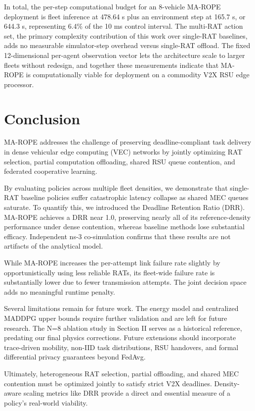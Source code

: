 \documentclass[journal,10pt,twocolumn]{IEEEtran}
\begin{document}
In total, the per-step computational budget for an 8-vehicle MA-ROPE deployment is fleet inference at 478.64 \textmu s plus an environment step at 165.7 \textmu s, or 644.3 \textmu s, representing 6.4\% of the 10 ms control interval. The multi-RAT action set, the primary complexity contribution of this work over single-RAT baselines, adds no measurable simulator-step overhead versus single-RAT offload. The fixed 12-dimensional per-agent observation vector lets the architecture scale to larger fleets without redesign, and together these measurements indicate that MA-ROPE is computationally viable for deployment on a commodity V2X RSU edge processor.



\section{Conclusion}

MA-ROPE addresses the challenge of preserving deadline-compliant task delivery in dense vehicular edge computing (VEC) networks by jointly optimizing RAT selection, partial computation offloading, shared RSU queue contention, and federated cooperative learning. 

By evaluating policies across multiple fleet densities, we demonstrate that single-RAT baseline policies suffer catastrophic latency collapse as shared MEC queues saturate. To quantify this, we introduced the Deadline Retention Ratio (DRR). MA-ROPE achieves a DRR near 1.0, preserving nearly all of its reference-density performance under dense contention, whereas baseline methods lose substantial efficacy. Independent ns-3 co-simulation confirms that these results are not artifacts of the analytical model.

While MA-ROPE increases the per-attempt link failure rate slightly by opportunistically using less reliable RATs, its fleet-wide failure rate is substantially lower due to fewer transmission attempts. The joint decision space adds no meaningful runtime penalty.

Several limitations remain for future work. The energy model and centralized MADDPG upper bounds require further validation and are left for future research. The N=8 ablation study in Section II serves as a historical reference, predating our final physics corrections. Future extensions should incorporate trace-driven mobility, non-IID task distributions, RSU handovers, and formal differential privacy guarantees beyond FedAvg.

Ultimately, heterogeneous RAT selection, partial offloading, and shared MEC contention must be optimized jointly to satisfy strict V2X deadlines. Density-aware scaling metrics like DRR provide a direct and essential measure of a policy's real-world viability.




\end{document}
